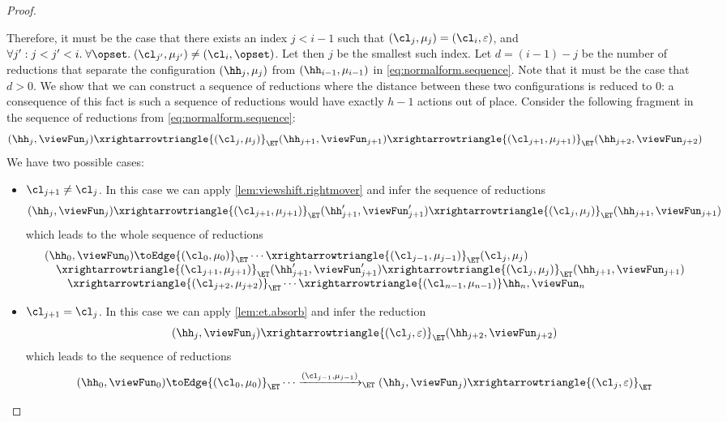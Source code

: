 \begin{proof}
\begin{enumerate}
Therefore, it must be the case that there exists an index $j < i-1$ such that $(\cl_{j}, \mu_{j}) = (\cl_{i}, \varepsilon)$, 
and $\forall j': j< j' < i.\;\forall \opset.\;(\cl_{j'}, \mu_{j'}) \neq (\cl_{i}, \opset)$. Let then $j$ be the smallest such index. 
Let $d = (i-1)-j$ be the number of reductions that separate the configuration $(\hh_{j}, \mu_{j})$ from 
$(\hh_{i-1}, \mu_{i-1})$ in \cref{eq:normalform.sequence}. Note that it must be the case that $d > 0$. We show that we can 
construct a sequence of reductions where the distance between these two configurations is reduced to $0$: 
a consequence of this fact is such a sequence of reductions would have exactly $h-1$ actions out of place.
Consider the following fragment in the sequence of reductions from \cref{eq:normalform.sequence}:
\[
(\hh_{j}, \viewFun_{j}) \xrightarrowtriangle{(\cl_{j}, \mu_{j})}_{\ET} (\hh_{j+1}, \viewFun_{j+1}) 
\xrightarrowtriangle{(\cl_{j+1}, \mu_{j+1})}_{\ET} (\hh_{j+2}, \viewFun_{j+2})
\]
We have two possible cases: 
\begin{itemize}
\item $\cl_{j+1} \neq \cl_{j}$. In this case we can apply \cref{lem:viewshift.rightmover} and infer the sequence of 
reductions 
\[
(\hh_{j}, \viewFun_{j}) \xrightarrowtriangle{(\cl_{j+1}, \mu_{j+1})}_{\ET} (\hh_{j+1}', \viewFun_{j+1}') 
\xrightarrowtriangle{(\cl_{j}, \mu_{j})}_{\ET} (\hh_{j+1}, \viewFun_{j+1})
\]
which leads to the whole sequence of reductions 
\[
\begin{array}{@{}l@{}}
(\hh_{0}, \viewFun_{0}) \toEdge{(\cl_{0}, \mu_{0})}_{\ET} \cdots 
\xrightarrowtriangle{(\cl_{j-1}, \mu_{j-1})}_{\ET} (\cl_{j}, \mu_{j}) \\
\quad \xrightarrowtriangle{(\cl_{j+1}, \mu_{j+1})}_{\ET} (\hh'_{j+1}, \viewFun'_{j+1}) 
\xrightarrowtriangle{(\cl_{j}, \mu_{j})}_{\ET} (\hh_{j+1}, \viewFun_{j+1})  \\
\qquad \xrightarrowtriangle{(\cl_{j+2}, \mu_{j+2})}_{\ET} \cdots \xrightarrowtriangle{(\cl_{n-1}, \mu_{n-1})} \hh_{n}, \viewFun_{n}
\end{array}
\]
\item $\cl_{j+1} = \cl_{j}$. In this case we can apply \cref{lem:et.absorb} and infer the reduction 
\[
(\hh_{j}, \viewFun_{j}) \xrightarrowtriangle{(\cl_{j}, \varepsilon)}_{\ET} (\hh_{j+2}, \viewFun_{j+2})
\]
which leads to the sequence of reductions 
\[
\begin{array}{@{}l@{}}
(\hh_{0}, \viewFun_{0}) \toEdge{(\cl_{0}, \mu_{0})}_{\ET} \cdots 
\xrightarrow{(\cl_{j-1}, \mu_{j-1})}_{\ET} (\hh_{j}, \viewFun_{j}) \xrightarrowtriangle{(\cl_{j}, \varepsilon)}_{\ET}  \\

\end{array}\]
\end{itemize}
\end{enumerate}
\end{proof}
